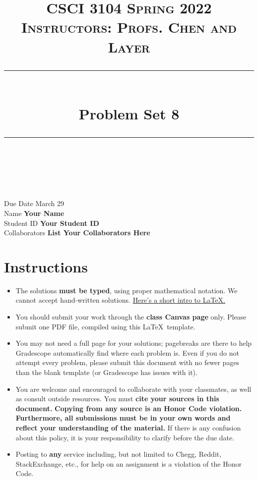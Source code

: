 \documentclass[11pt]{article}
\title{
\normalfont \normalsize 
\textsc{CSCI 3104 Spring 2022 \\ 
Instructors: Profs. Chen and Layer} \\
[10pt] 
\rule{\linewidth}{0.5pt} \\[6pt] 
\huge Problem Set 8 \\
\rule{\linewidth}{2pt}  \\[10pt]
}
\date{}
\theoremstyle{definition}
\theoremstyle{definition}
\theoremstyle{definition}
\begin{document}
\maketitle


\noindent
Due Date \dotfill March 29 \\
Name \dotfill \textbf{Your Name} \\
Student ID \dotfill \textbf{Your Student ID} \\
Collaborators \dotfill \textbf{List Your Collaborators Here}

\tableofcontents

\section{Instructions}
 \begin{itemize}
	\item The solutions \textbf{must be typed}, using proper mathematical notation. We cannot accept hand-written solutions. \href{http://ece.uprm.edu/~caceros/latex/introduction.pdf}{Here's a short intro to \LaTeX.}
	\item You should submit your work through the \textbf{class Canvas page} only. Please submit one PDF file, compiled using this \LaTeX \ template.
	\item You may not need a full page for your solutions; pagebreaks are there to help Gradescope automatically find where each problem is. Even if you do not attempt every problem, please submit this document with no fewer pages than the blank template (or Gradescope has issues with it).

	\item You are welcome and encouraged to collaborate with your classmates, as well as consult outside resources. You must \textbf{cite your sources in this document.} \textbf{Copying from any source is an Honor Code violation. Furthermore, all submissions must be in your own words and reflect your understanding of the material.} If there is any confusion about this policy, it is your responsibility to clarify before the due date. 

	\item Posting to \textbf{any} service including, but not limited to Chegg, Reddit, StackExchange, etc., for help on an assignment is a violation of the Honor Code.
\end{itemize}
\end{document}
